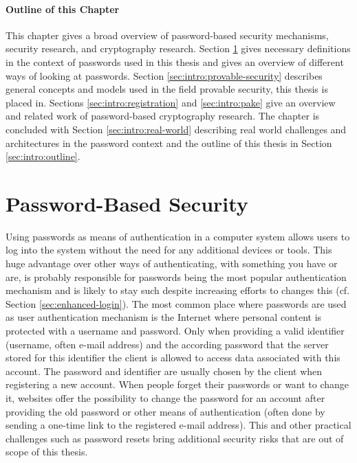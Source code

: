 \paragraph{Outline of this Chapter}
This chapter gives a broad overview of password-based security mechanisms, security research, and cryptography research.
Section \ref{sec:intro:pwd-security} gives necessary definitions in the context of passwords used in this thesis and gives an overview of different ways of looking at passwords.
Section \ref{sec:intro:provable-security} describes general concepts and models used in the field provable security, this thesis is placed in.
Sections \ref{sec:intro:registration} and \ref{sec:intro:pake} give an overview and related work of password-based cryptography research.
The chapter is concluded with Section \ref{sec:intro:real-world} describing real world challenges and architectures in the password context and the outline of this thesis in Section \ref{sec:intro:outline}.


\section{Password-Based Security} \label{sec:intro:pwd-security}
Using passwords as means of authentication in a computer system allows users to log into the system without the need for any additional devices or tools.
This huge advantage over other ways of authenticating, \ie with something you have or are, is probably responsible for passwords being the most popular authentication mechanism and is likely to stay such despite increasing efforts to changes this (cf. Section \ref{sec:enhanced-login}).
The most common place where passwords are used as user authentication mechanism is the Internet where personal content is protected with a username and password.
Only when providing a valid identifier (username, often e-mail address) and the according password that the server stored for this identifier the client is allowed to access data associated with this account.
The password and identifier are usually chosen by the client when registering a new account.
When people forget their passwords or want to change it, websites offer the possibility to change the password for an account after providing the old password or other means of authentication (often done by sending a one-time link to the registered e-mail address).
This and other practical challenges such as password resets bring additional security risks that are out of scope of this thesis.


